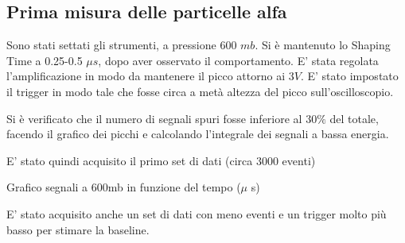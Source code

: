 \subsection{Prima misura delle particelle alfa}
\FloatBarrier
Sono stati settati gli strumenti, a pressione 600 $mb$.
Si è mantenuto lo Shaping Time a 0.25-0.5 $\mu s$, dopo aver osservato il comportamento. %
E' stata regolata l'amplificazione in modo da mantenere il picco attorno ai $3V$.
E' stato impostato il trigger in modo tale che fosse circa a metà altezza del picco sull'oscilloscopio. 


Si è verificato che il numero di segnali spuri fosse inferiore al $30 \%$ del totale, facendo il grafico dei picchi e calcolando l'integrale dei segnali a bassa energia.

E' stato quindi acquisito il primo set di dati (circa 3000 eventi)

\begin{grafico}
 \centering
 \caption{Grafico segnali a 600mb in funzione del tempo ($\mu$ s)} 
 \label{gr:misura_600} 
\end{grafico}


E' stato acquisito anche un set di dati con meno eventi e un trigger molto più basso per stimare la baseline.

